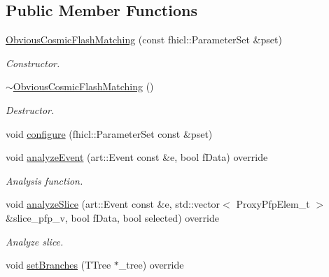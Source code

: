 \subsection*{Public Member Functions}
\begin{DoxyCompactItemize}
\item 
\hyperlink{classanalysis_1_1ObviousCosmicFlashMatching_a83be7e60be73f5d4297ae617b5f7c70f}{Obvious\-Cosmic\-Flash\-Matching} (const fhicl\-::\-Parameter\-Set \&pset)
\begin{DoxyCompactList}\small\item\em Constructor. \end{DoxyCompactList}\item 
\hypertarget{classanalysis_1_1ObviousCosmicFlashMatching_a130b94ad72bcc4157edc74e53d26d1c6}{\hyperlink{classanalysis_1_1ObviousCosmicFlashMatching_a130b94ad72bcc4157edc74e53d26d1c6}{$\sim$\-Obvious\-Cosmic\-Flash\-Matching} ()}\label{classanalysis_1_1ObviousCosmicFlashMatching_a130b94ad72bcc4157edc74e53d26d1c6}

\begin{DoxyCompactList}\small\item\em Destructor. \end{DoxyCompactList}\item 
void \hyperlink{classanalysis_1_1ObviousCosmicFlashMatching_a1ab342bc97749873a4e3118ab541af86}{configure} (fhicl\-::\-Parameter\-Set const \&pset)
\item 
void \hyperlink{classanalysis_1_1ObviousCosmicFlashMatching_ac2abf5075cbd03ffde102e14ae260707}{analyze\-Event} (art\-::\-Event const \&e, bool f\-Data) override
\begin{DoxyCompactList}\small\item\em Analysis function. \end{DoxyCompactList}\item 
\hypertarget{classanalysis_1_1ObviousCosmicFlashMatching_adbdb066be56f971dc6dc4191a56b5693}{void \hyperlink{classanalysis_1_1ObviousCosmicFlashMatching_adbdb066be56f971dc6dc4191a56b5693}{analyze\-Slice} (art\-::\-Event const \&e, std\-::vector$<$ Proxy\-Pfp\-Elem\-\_\-t $>$ \&slice\-\_\-pfp\-\_\-v, bool f\-Data, bool selected) override}\label{classanalysis_1_1ObviousCosmicFlashMatching_adbdb066be56f971dc6dc4191a56b5693}

\begin{DoxyCompactList}\small\item\em Analyze slice. \end{DoxyCompactList}\item 
\hypertarget{classanalysis_1_1ObviousCosmicFlashMatching_ae3cb2192a7edde6b72b18f172f012c12}{void \hyperlink{classanalysis_1_1ObviousCosmicFlashMatching_ae3cb2192a7edde6b72b18f172f012c12}{set\-Branches} (T\-Tree $\ast$\-\_\-tree) override}\label{classanalysis_1_1ObviousCosmicFlashMatching_ae3cb2192a7edde6b72b18f172f012c12}


\end{DoxyCompactItemize}
